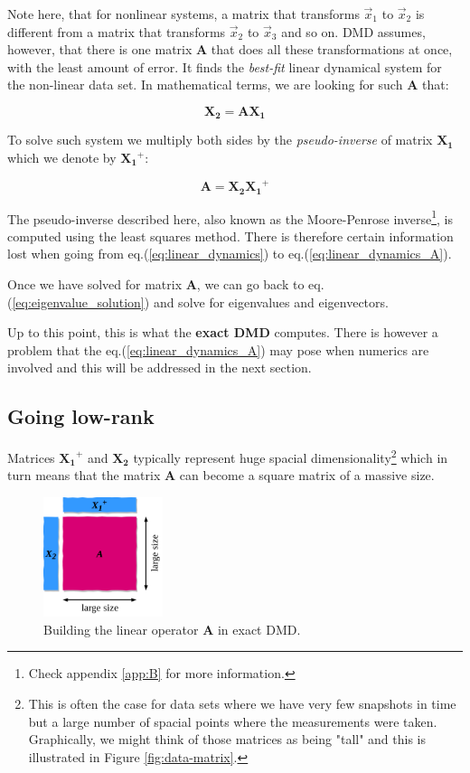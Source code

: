\documentclass[10pt,twocolumn]{article}
\begin{document}
Note here, that for nonlinear systems, a matrix that transforms $\vec{x}_1$ to $\vec{x}_2$ is different from a matrix that transforms $\vec{x}_2$ to $\vec{x}_3$ and so on. DMD assumes, however, that there is one matrix $\bm{A}$ that does all these transformations at once, with the least amount of error. It finds the \textit{best-fit} linear dynamical system for the non-linear data set. In mathematical terms, we are looking for such $\bm{A}$ that:

\begin{equation} \label{eq:linear_dynamics}
\bm{X_2} = \bm{A} \bm{X_1}
\end{equation}

To solve such system we multiply both sides by the \textit{pseudo-inverse} of matrix $\bm{X_1}$ which we denote by $\bm{X_1}^{+}$:

\begin{equation} \label{eq:linear_dynamics_A}
\bm{A} = \bm{X_2} \bm{X_1}^{+}
\end{equation}

The pseudo-inverse described here, also known as the Moore-Penrose inverse\footnote{Check appendix \ref{app:B} for more information.}, is computed using the least squares method. There is therefore certain information lost when going from eq.(\ref{eq:linear_dynamics}) to eq.(\ref{eq:linear_dynamics_A}).

Once we have solved for matrix $\bm{A}$, we can go back to eq.(\ref{eq:eigenvalue_solution}) and solve for eigenvalues and eigenvectors.

Up to this point, this is what the \textbf{exact DMD} computes. There is however a problem that the eq.(\ref{eq:linear_dynamics_A}) may pose when numerics are involved and this will be addressed in the next section. 

\subsection{Going low-rank}

Matrices $\bm{X_1}^{+}$ and $\bm{X_2}$ typically represent huge spacial dimensionality\footnote{This is often the case for data sets where we have very few snapshots in time but a large number of spacial points where the measurements were taken. Graphically, we might think of those matrices as being "tall" and this is illustrated in Figure \ref{fig:data-matrix}.} which in turn means that the matrix $\bm{A}$ can become a square matrix of a massive size. 

\begin{figure}
\centering\includegraphics[width=3.5cm]{getting-A.png}
\caption{Building the linear operator $\bm{A}$ in exact DMD.}
\label{fig:building-A}
\end{figure}
\end{document}
